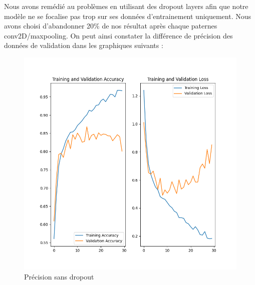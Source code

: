 \documentclass[12pt ,a4paper ]{article}
\begin{document}
\begin{multicols}{2}
Nous avons remédié au problèmes en utilisant des dropout layers afin que notre modèle ne se focalise pas trop sur ses données d'entrainement uniquement. Nous avons choisi d'abandonner 20\% de nos résultat après chaque paternes conv2D/maxpooling. On peut ainsi constater la différence de précision des données de validation dans les graphiques suivants : 

\begin{figure}[H]
    \begin{center}
        \includegraphics[scale=0.4]{./img/figure_3.png}
    \end{center}
\caption{\small{Précision sans dropout}}
\end{figure}


\end{multicols}
\end{document}
